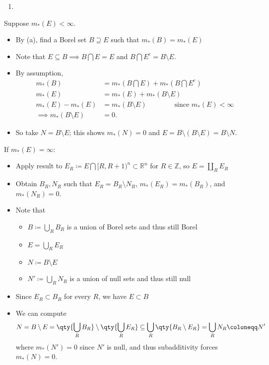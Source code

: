 \begin{solution}
\begin{enumerate}
\def\labelenumi{\alph{enumi}.}
\setcounter{enumi}{1}
\tightlist
\item
\end{enumerate}

Suppose \(m_*(E) < \infty\).

\begin{itemize}
\tightlist
\item
  By (a), find a Borel set \(B\supseteq E\) such that
  \(m_*(B) = m_*(E)\)
\item
  Note that \(E\subseteq B \implies B\displaystyle\bigcap E = E\) and
  \(B\displaystyle\bigcap E^c = B\setminus E\).
\item
  By assumption,
  \begin{align*}
  m_*(B) &= m_*(B\displaystyle\bigcap E) + m_*(B\displaystyle\bigcap E^c) \\
  m_*(E) &= m_*(E) + m_*(B\setminus E) \\ 
  m_*(E) - m_*(E) &= m_*(B\setminus E) \qquad\qquad\text{since } m_*(E) < \infty \\ 
  \implies m_*(B\setminus E) &= 0
  .\end{align*}
\item
  So take \(N = B\setminus E\); this shows \(m_*(N) = 0\) and
  \(E = B\setminus (B\setminus E) = B\setminus N\).
\end{itemize}

If \(m_*(E) = \infty\):

\begin{itemize}
\tightlist
\item
  Apply result to
  \(E_R\coloneqq E \displaystyle\bigcap[R, R+1)^n \subset {\mathbb{R}}^n\)
  for \(R\in {\mathbb{Z}}\), so \(E = {\textstyle\coprod}_R E_R\)
\item
  Obtain \(B_R, N_R\) such that \(E_R = B_R \setminus N_R\),
  \(m_*(E_R) = m_*(B_R)\), and \(m_*(N_R) = 0\).
\item
  Note that

  \begin{itemize}
  \tightlist
  \item
    \(B\coloneqq\displaystyle\bigcup_R B_R\) is a union of Borel sets
    and thus still Borel
  \item
    \(E = \displaystyle\bigcup_R E_R\)
  \item
    \(N\coloneqq B\setminus E\)
  \item
    \(N' \coloneqq\displaystyle\bigcup_R N_R\) is a union of null sets
    and thus still null
  \end{itemize}
\item
  Since \(E_R \subset B_R\) for every \(R\), we have \(E\subset B\)
\item
  We can compute
  \begin{align*}
  N = B\setminus E = \qty{ \displaystyle\bigcup_R B_R } \setminus \qty{\displaystyle\bigcup_R E_R } \subseteq \displaystyle\bigcup_R \qty{B_R\setminus E_R} = \displaystyle\bigcup_R N_R \coloneqq N'
  \end{align*}
  where \(m_*(N') = 0\) since \(N'\) is null, and thus subadditivity
  forces \(m_*(N) = 0\).
\end{itemize}


\end{solution}
